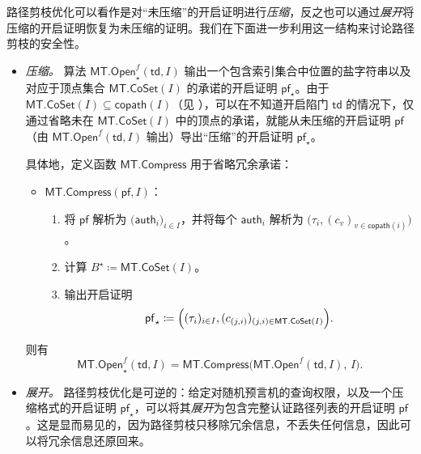 \documentclass[american,singlepageview]{snargs-book-zh}
\newcommand{\DefineEqual}{\coloneqq}
\newcommand{\ProtoSalt}{\tau}
\newcommand{\ROFunction}{f}
\newcommand{\MTGraphVertex}{v}
\newcommand{\MTCoPath}{\mathsf{copath}}
\newcommand{\MTLayer}{j}
\newcommand{\MTSymbol}{\mathsf{MT}}
\newcommand{\MTOpen}{\MTSymbol.\mathsf{Open}}
\newcommand{\MTVertexLabel}{c}
\newcommand{\MTVertexLabelByName}[2]{\MTVertexLabel_{(#1,#2)}}
\newcommand{\MTTrapdoor}{\mathsf{td}}
\newcommand{\MTAuthPath}{\mathsf{auth}}
\newcommand{\MTProof}{\mathsf{pf}}
\newcommand{\MTMessageIndex}{i}
\newcommand{\MTMessageIndexSet}{I}
\newcommand{\MTSaltString}{\ProtoSalt}
\newcommand{\MTDeriveVertexSet}{\MTSymbol.\mathsf{CoSet}}
\newcommand{\MTCoPathVarVertexSet}{B^{\star}}
\newcommand{\MTCompressOpening}{\MTSymbol.\mathsf{Compress}}
\begin{document}
路径剪枝优化可以看作是对“未压缩”的开启证明进行\emph{压缩}，反之也可以通过\emph{展开}将压缩的开启证明恢复为未压缩的证明。我们在下面进一步利用这一结构来讨论路径剪枝的安全性。
\begin{itemize}

  \item \emph{压缩。}
  算法 $\MTOpen_{\star}^{\ROFunction}(\MTTrapdoor,\MTMessageIndexSet)$ 输出一个包含索引集合中位置的盐字符串以及对应于顶点集合 $\MTDeriveVertexSet(\MTMessageIndexSet)$ 的承诺的开启证明 $\MTProof_{\star}$。由于 $\MTDeriveVertexSet(\MTMessageIndexSet)\subseteq \MTCoPath(\MTMessageIndexSet)$（见 ），可以在不知道开启陷门 $\MTTrapdoor$ 的情况下，仅通过省略未在 $\MTDeriveVertexSet(\MTMessageIndexSet)$ 中的顶点的承诺，就能从未压缩的开启证明 $\MTProof$（由 $\MTOpen^{\ROFunction}(\MTTrapdoor,\MTMessageIndexSet)$ 输出）导出“压缩”的开启证明 $\MTProof_{\star}$。

  具体地，定义函数 $\MTCompressOpening$ 用于省略冗余承诺：
  \begin{itemize}
    \item[] $\MTCompressOpening(\MTProof,\MTMessageIndexSet)$：
    \begin{enumerate}[nolistsep]
      \item 将 $\MTProof$ 解析为 $\bigl(\MTAuthPath_{\MTMessageIndex}\bigr)_{\MTMessageIndex\in\MTMessageIndexSet}$，并将每个 $\MTAuthPath_{\MTMessageIndex}$ 解析为 $\bigl(\MTSaltString_{\MTMessageIndex},(\MTVertexLabel_{\MTGraphVertex})_{\MTGraphVertex\in\MTCoPath(\MTMessageIndex)}\bigr)$。
      \item 计算 $\MTCoPathVarVertexSet\DefineEqual \MTDeriveVertexSet(\MTMessageIndexSet)$。
      \item 输出开启证明
      \[
        \MTProof_{\star} \DefineEqual 
        \Bigl(
          (\MTSaltString_{\MTMessageIndex})_{\MTMessageIndex\in\MTMessageIndexSet},
          (\MTVertexLabelByName{\MTLayer}{\MTMessageIndex})_{(\MTLayer,\MTMessageIndex)\in\MTDeriveVertexSet(\MTMessageIndexSet)}
        \Bigr).
      \]
    \end{enumerate}
  \end{itemize}
  则有
  \[
    \MTOpen_{\star}^{\ROFunction}(\MTTrapdoor,\MTMessageIndexSet)
    =
    \MTCompressOpening\bigl(\MTOpen^{\ROFunction}(\MTTrapdoor,\MTMessageIndexSet),\,\MTMessageIndexSet\bigr).
  \]

  \item \emph{展开。}
  路径剪枝优化是可逆的：给定对随机预言机的查询权限，以及一个压缩格式的开启证明 $\MTProof_{\star}$，可以将其\emph{展开}为包含完整认证路径列表的开启证明 $\MTProof$。这是显而易见的，因为路径剪枝只移除冗余信息，不丢失任何信息，因此可以将冗余信息还原回来。


\end{itemize}
\end{document}
